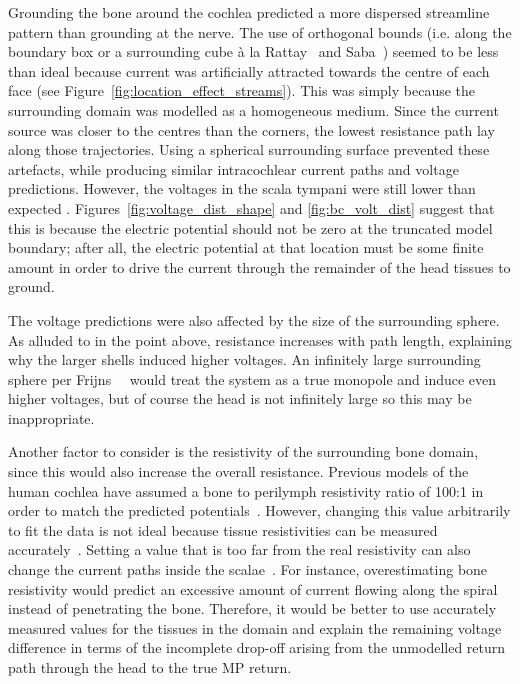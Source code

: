 Grounding the bone around the cochlea predicted a more dispersed streamline
pattern than grounding at the nerve. The use of orthogonal bounds (i.e.
along the boundary box or a surrounding cube \`a la
Rattay~\cite{rattay2001model} and Saba~\cite{saba2012}) seemed to be less than
ideal because current was artificially attracted towards the centre of each face
(see Figure~\ref{fig:location_effect_streams}). This was simply because the
surrounding domain was modelled as a homogeneous medium. Since the current
source was closer to the centres than the corners, the lowest resistance path
lay along those trajectories. Using a spherical surrounding surface prevented
these artefacts, while producing similar intracochlear current paths and voltage
predictions. However, the voltages in the scala tympani were still lower than
expected \invivo. Figures~\ref{fig:voltage_dist_shape} and
\ref{fig:bc_volt_dist} suggest that this is because the electric potential
should not be zero at the truncated model boundary; after all, the electric
potential at that location must be some finite amount in order to drive the
current through the remainder of the head tissues to ground.

The voltage predictions were also affected by the size of the surrounding
sphere. As alluded to in the point above, resistance increases with path length,
explaining why the larger shells induced higher voltages. An infinitely large
surrounding sphere per Frijns~\etal~\cite{frijns2000} would treat the system as
a true monopole and induce even higher voltages, but of course the head is not
infinitely large so this may be inappropriate.

Another factor to consider is the resistivity of the surrounding bone domain,
since this would also increase the overall resistance. Previous models of the
human cochlea have assumed a bone to perilymph resistivity ratio of 100:1 in
order to match the predicted potentials~\cite{mens1999,whiten2007,kalkman2014}.
However, changing this value arbitrarily to fit the data is not ideal because
tissue resistivities can be measured accurately~\cite{suesserman1992}.
Setting a value that is too far from the real resistivity can also change the
current paths inside the scalae~\cite{wong2013mb}. For instance, overestimating
bone resistivity would predict an excessive amount of current flowing along the
spiral instead of penetrating the bone. Therefore, it would be better to use
accurately measured values for the tissues in the domain and explain the
remaining voltage difference in terms of the incomplete drop-off arising from
the unmodelled return path through the head to the true MP return.

